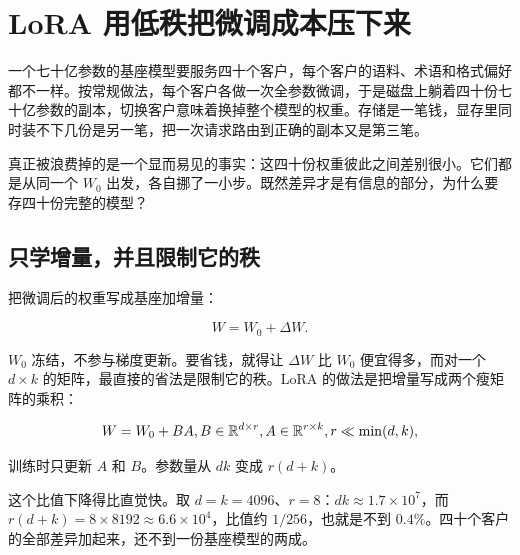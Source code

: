 \section{LoRA 用低秩把微调成本压下来}
\label{sec:14-Deep-Learning/09-Scaling-and-Adaptation/03}

一个七十亿参数的基座模型要服务四十个客户，每个客户的语料、术语和格式偏好都不一样。按常规做法，每个客户各做一次全参数微调，于是磁盘上躺着四十份七十亿参数的副本，切换客户意味着换掉整个模型的权重。存储是一笔钱，显存里同时装不下几份是另一笔，把一次请求路由到正确的副本又是第三笔。

真正被浪费掉的是一个显而易见的事实：这四十份权重彼此之间差别很小。它们都是从同一个 \(W_0\) 出发，各自挪了一小步。既然差异才是有信息的部分，为什么要存四十份完整的模型？

\subsection{只学增量，并且限制它的秩}

把微调后的权重写成基座加增量：

\[
  W = W_0 + \Delta W .
\]

\(W_0\) 冻结，不参与梯度更新。要省钱，就得让 \(\Delta W\) 比 \(W_0\) 便宜得多，而对一个 \(d \times k\) 的矩阵，最直接的省法是限制它的秩。LoRA 的做法是把增量写成两个瘦矩阵的乘积：

\[
  W = W_0 + BA,
  \space B \in \mathbb{R}^{d \times r},\space A \in \mathbb{R}^{r \times k},\space r \ll \min(d, k),
\]

训练时只更新 \(A\) 和 \(B\)。参数量从 \(dk\) 变成 \(r(d + k)\)。

这个比值下降得比直觉快。取 \(d = k = 4096\)、\(r = 8\)：\(dk \approx 1.7 \times 10^{7}\)，而 \(r(d+k) = 8 \times 8192 \approx 6.6 \times 10^{4}\)，比值约 \(1/256\)，也就是不到 \(0.4\%\)。四十个客户的全部差异加起来，还不到一份基座模型的两成。

